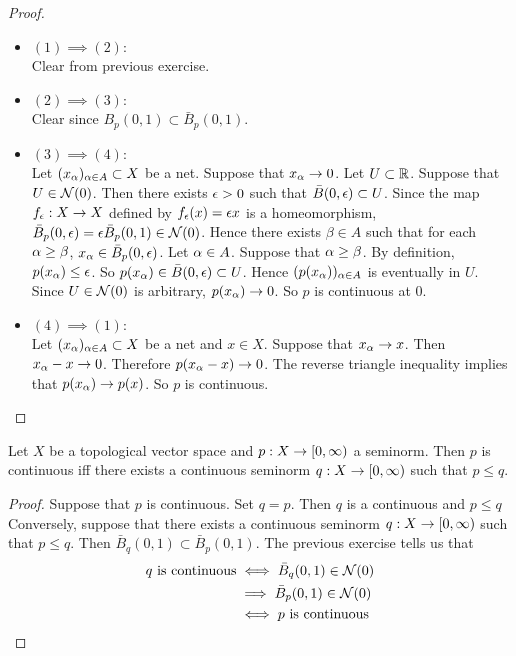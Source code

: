 \documentclass{book}
\begin{document}
	\begin{proof}\
		\begin{itemize}
			\item $(1) \implies (2)$: \\
			Clear from previous exercise. \\
			\item $(2) \implies (3)$: \\
			Clear since $B_p(0,1) \subset \bar{B}_p(0,1)$. \\
			\item $(3) \implies (4)$: \\
			Let $(x_{\alpha})_{\alpha \in A} \subset X$ be a net. Suppose that $x_{\alpha} \rightarrow 0$. Let $U \subset \mathbb{R}$. Suppose that $U \in \mathcal{N}(0)$. Then there exists $\epsilon > 0$ such that $\bar{B}(0, \epsilon) \subset U$. Since the map $f_{\epsilon}: X \rightarrow X$ defined by $f_{\epsilon}(x) = \epsilon x$ is a homeomorphism, $\bar{B}_p(0,\epsilon) = \epsilon \bar{B}_p(0,1) \in \mathcal{N}(0)$. Hence there exists $\beta \in A$ such that for each $\alpha \geq \beta$, $x_{\alpha} \in \bar{B}_p(0, \epsilon)$. Let $\alpha \in A$. Suppose that $\alpha \geq \beta$. By definition, $p(x_{\alpha}) \leq \epsilon$. So $p(x_{\alpha}) \in \bar{B}(0,\epsilon) \subset U$. Hence $(p(x_{\alpha}))_{\alpha \in A}$ is eventually in $U$. Since $U \in \mathcal{N}(0)$ is arbitrary, $p(x_{\alpha}) \rightarrow 0$. So $p$ is continuous at $0$. \\
			\item $(4) \implies (1)$: \\
			Let $(x_{\alpha})_{\alpha \in A} \subset X$ be a net and $x \in X$. Suppose that $x_{\alpha} \rightarrow x$. Then $x_{\alpha} - x \rightarrow 0$. Therefore $p(x_{\alpha} - x) \rightarrow 0$. The reverse triangle inequality implies that $p(x_{\alpha}) \rightarrow p(x)$. So $p$ is continuous.
		\end{itemize}
	\end{proof}

	\begin{ex}
		Let $X$ be a topological vector space and $p:X \rightarrow [0,\infty)$ a seminorm. Then $p$ is continuous iff there exists a continuous seminorm $q: X \rightarrow [0,\infty)$ such that $p \leq q$. 
	\end{ex}

	\begin{proof}
		Suppose that $p$ is continuous. Set $q = p$. Then $q$ is a continuous and $p \leq q$\\
		Conversely, suppose that there exists a continuous seminorm $q:X \rightarrow [0,\infty)$ such that $p \leq q$. Then $\bar{B}_q(0,1) \subset \bar{B}_p(0,1)$. The previous exercise tells us that 
		\begin{align*}
			q \text{ is continuous} 
			& \iff \bar{B}_q(0,1) \in \mathcal{N}(0) \\
			& \implies \bar{B}_p(0,1) \in \mathcal{N}(0) \\
			& \iff p \text{ is continuous} 
		\end{align*}
	\end{proof}
\end{document}
